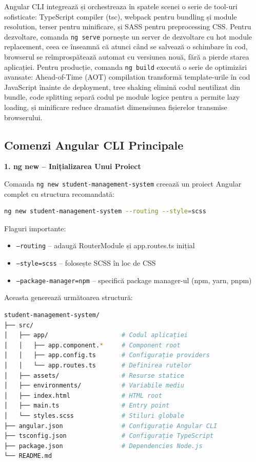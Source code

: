 Angular CLI integrează și orchestreaza în spatele scenei o serie de tool-uri sofisticate: TypeScript compiler (tsc), webpack pentru bundling și module resolution, terser pentru minificare, și SASS pentru preprocessing CSS. Pentru dezvoltare, comanda \texttt{ng serve} pornește un server de dezvoltare cu hot module replacement, ceea ce înseamnă că atunci când se salvează o schimbare în cod, browserul se reîmprospătează automat cu versiunea nouă, fără a pierde starea aplicației. Pentru producție, comanda \texttt{ng build} execută o serie de optimizări avansate: Ahead-of-Time (AOT) compilation transformă template-urile în cod JavaScript înainte de deployment, tree shaking elimină codul neutilizat din bundle, code splitting separă codul pe module logice pentru a permite lazy loading, și minificare reduce dramatist dimensiunea fișierelor transmise browserului.

\subsection{Comenzi Angular CLI Principale}

\textbf{1. ng new – Inițializarea Unui Proiect}

Comanda \texttt{ng new student-management-system} creează un proiect Angular complet cu structura recomandată:

\begin{lstlisting}[language=bash]
ng new student-management-system --routing --style=scss
\end{lstlisting}

Flaguri importante:
\begin{itemize}
  \item \texttt{--routing} – adaugă RouterModule și app.routes.ts inițial
  \item \texttt{--style=scss} – folosește SCSS în loc de CSS
  \item \texttt{--package-manager=npm} – specifică package manager-ul (npm, yarn, pnpm)
\end{itemize}

Aceasta generează următoarea structură:

\begin{lstlisting}[language=bash]
student-management-system/
├── src/
│   ├── app/                    # Codul aplicației
│   │   ├── app.component.*     # Component root
│   │   ├── app.config.ts       # Configurație providers
│   │   └── app.routes.ts       # Definirea rutelor
│   ├── assets/                 # Resurse statice
│   ├── environments/           # Variabile mediu
│   ├── index.html              # HTML root
│   ├── main.ts                 # Entry point
│   └── styles.scss             # Stiluri globale
├── angular.json                # Configurație Angular CLI
├── tsconfig.json               # Configurație TypeScript
├── package.json                # Dependencies Node.js
└── README.md
\end{lstlisting}

